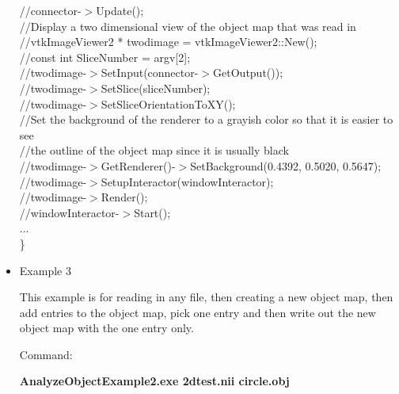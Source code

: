 \documentclass{InsightArticle}
\begin{document}
\begin{itemize}
{		//connector-$>$Update();\\
		
		//Display a two dimensional view of the object map that was read in\\
		//vtkImageViewer2 * twodimage = vtkImageViewer2::New();\\
		
		//const int SliceNumber = argv[2];\\
		//twodimage-$>$SetInput(connector-$>$GetOutput());\\
		//twodimage-$>$SetSlice(sliceNumber);\\
		//twodimage-$>$SetSliceOrientationToXY();\\
		
		//Set the background of the renderer to a grayish color so that it is easier to see\\
		//the outline of the object map since it is usually black\\
		//twodimage-$>$GetRenderer()-$>$SetBackground(0.4392, 0.5020, 0.5647);\\
		
		
		//twodimage-$>$SetupInteractor(windowInteractor);\\
		
		//twodimage-$>$Render();\\
		//windowInteractor-$>$Start();\\
		...\\
\}
}
                                                                               
\item Example 3

This example is for reading in any file, then creating a new object map, then add entries to the object map, pick one entry and then write out the new object map with the one entry only.

Command:

\textbf{AnalyzeObjectExample2.exe 2dtest.nii circle.obj}

\end{itemize}
\end{document}
